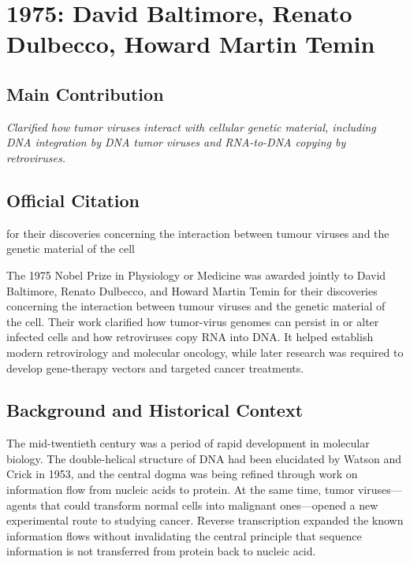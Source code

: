 \chapter[1975 --- Baltimore, Dulbecco, and Temin]{1975: David Baltimore, Renato Dulbecco, Howard Martin Temin}
\label{ch:1975_Baltimore}

\section*{Main Contribution}

\textit{Clarified how tumor viruses interact with cellular genetic material, including DNA integration by DNA tumor viruses and RNA-to-DNA copying by retroviruses.}\cite{nobel-1975,lecture-1975,lecture-dulbecco-1975,lecture-temin-1975}

\section{Official Citation}

for their discoveries concerning the interaction between tumour viruses and the genetic material of the cell

The 1975 Nobel Prize in Physiology or Medicine was awarded jointly to David Baltimore, Renato Dulbecco, and Howard Martin Temin for their discoveries concerning the interaction between tumour viruses and the genetic material of the cell. Their work clarified how tumor-virus genomes can persist in or alter infected cells and how retroviruses copy RNA into DNA. It helped establish modern retrovirology and molecular oncology, while later research was required to develop gene-therapy vectors and targeted cancer treatments.

\section{Background and Historical Context}

The mid-twentieth century was a period of rapid development in molecular biology. The double-helical structure of DNA had been elucidated by Watson and Crick in 1953, and the central dogma was being refined through work on information flow from nucleic acids to protein. At the same time, tumor viruses---agents that could transform normal cells into malignant ones---opened a new experimental route to studying cancer. Reverse transcription expanded the known information flows without invalidating the central principle that sequence information is not transferred from protein back to nucleic acid.

